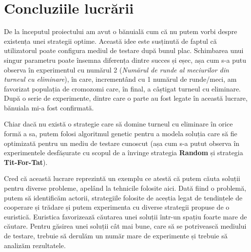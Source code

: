 \chapter*{Concluziile lucrării}

De la începutul proiectului am avut o bănuială cum că nu putem vorbi despre existența unei strategii optime. Această idee este susținută de faptul că utilizatorul poate configura mediul de testare după bunul plac. Schimbarea unui singur parametru poate însemna diferența dintre succes și eșec, așa cum s-a putu observa în experimentul cu numărul 2 (\textit{Numărul de runde al meciurilor din turneul cu eliminare}), în care, incrementând cu 1 numărul de runde/meci, am favorizat populația de cromozomi care, în final, a câștigat turneul cu eliminare. După o serie de experimente, dintre care o parte au fost legate în această lucrare, bănuiala mi-a fost confirmată.  
 
Chiar dacă nu există o strategie care să domine turneul cu eliminare în orice formă a sa, putem folosi algoritmul genetic pentru a modela soluția care să fie optimizată pentru un mediu de testare cunoscut (așa cum s-a putut observa în experimentele desfășurate cu scopul de a învinge strategia \textbf{Random} și strategia \textbf{Tit-For-Tat}). 
  
Cred că această lucrare reprezintă un exemplu ce atestă că putem căuta soluții pentru diverse probleme, apelând la tehnicile folosite aici. Dată fiind o problemă, putem să identificăm actorii, strategiile folosite de aceștia legat de tendințele de cooperare și trădare și putem experimenta cu diverse strategii propuse de o euristică. Euristica favorizează căutarea unei soluții într-un spațiu foarte mare de căutare. Pentru găsirea unei soluții cât mai bune, care să se potrivească mediului de testare, trebuie să derulăm un număr mare de experimente și trebuie să analizăm rezultatele. 

\clearpage